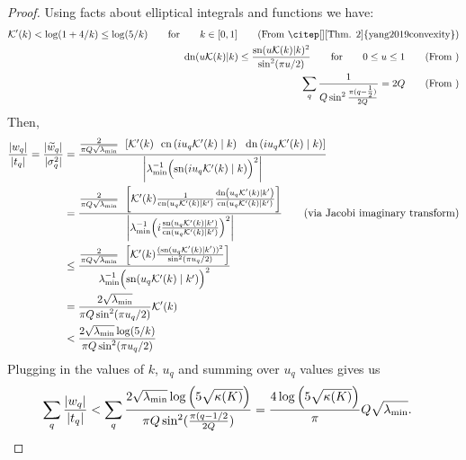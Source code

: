\begin{proof}
  Using facts about elliptical integrals and functions we have\cite{yang2019convexity,siegl2016extremal,olver2010nist}:
  \begin{align}
    \mathcal{K}'(k) < \log(1 + 4 / k) \leq \log( 5 / k) \qquad {\rm for} \qquad k \in [0, 1]
    \tag{From \citep[][Thm. 2]{yang2019convexity}}
    \\
    \text{dn}(u \mathcal{K}(k) | k ) \le \frac{\text{sn}(u \mathcal{K}(k) | k )^2}{\sin^2(\pi u/2)} \qquad {\rm for} \qquad 0 \le u \le 1
    \tag{From \gp{? maybe \citep{siegl2016extremal}}}
    \\
    \sum_q \frac{1}{ Q \sin^2 \frac{\pi(q-\tfrac{1}{2})}{2Q} }  = 2 Q
    \tag{From \gp{?}}
  \end{align}
  Then,
  \begin{align*}
    \frac{|w_q|}{|t_q|}
    =
    \frac{|\widetilde w_q|}{|\sigma^2_q|}
    &= \frac{
      \frac{ 2 }{ \pi Q \sqrt{\lambda_\text{min}} }
      \:\: \left[
      \mathcal{K}'( k )
      \:\:\: \text{cn} \left( i u_q \mathcal{K}'(k) \mid k \right)
      \:\:\: \text{dn} \left( i u_q \mathcal{K}'(k) \mid k \right)
      \right]
    }{
      \left| \lambda_\text{min}^{-1} \Bigl( \text{sn}(i u_q \mathcal{K}'(k) \mid k) \Bigr)^2 \right|
    }
    \\
    &= \frac{
      \frac{ 2 }{ \pi Q \sqrt{\lambda_\text{min}} }
      \:\: \left[
      \mathcal{K}'( k )
      \frac{
        1
      }{
        \text{cn} \left( u_q \mathcal{K}'(k) \mid k' \right)
      }
      \frac{
        \text{dn} \left( u_q \mathcal{K}'(k) \mid k' \right)
      }{
        \text{cn} \left( u_q \mathcal{K}'(k) \mid k' \right)
      }
      \right]
    }{
      \left| \lambda_\text{min}^{-1} \Bigl( i \frac{
        \text{sn}(u_q \mathcal{K}'(k) \mid k')
      }{
        \text{cn}(u_q \mathcal{K}'(k) \mid k')
      }\Bigr)^2 \right|
    }
    \tag{via Jacobi imaginary transform}
    \\
    &\leq \frac{
      \frac{ 2 }{ \pi Q \sqrt{\lambda_\text{min}} }
      \:\: \left[
        \mathcal{K}'( k ) \frac{
          ({
            \text{sn}(u_q \mathcal{K}'(k) \mid k')
          })^2
        }{
          \sin^2 ( \pi u_q / 2)
        }
      \right]
    }{
      \lambda_\text{min}^{-1} \Bigl({
        \text{sn}(u_q \mathcal{K}'(k) \mid k')
      }\Bigr)^2
    }
    \\
    &= \frac{ 2 \sqrt{\lambda_\text{min}} }{ \pi Q \sin^2 ( \pi u_q / 2) } \mathcal{K}'(k)
    \\
    &< \frac{ 2 \sqrt{\lambda_\text{min}} \log(5 / k) }{ \pi Q \sin^2 ( \pi u_q / 2) }
  \end{align*}
  Plugging in the values of $k$, $u_q$ and summing over $u_q$ values gives us
  \begin{align}
    \sum_{q} \frac{|w_q|}{|t_q|}
    &<
    \sum_{q} \frac{ 2 \sqrt{\lambda_\text{min}} \log \left( 5 \sqrt{\kappa(K)} \right)}
    { \pi Q \sin^2 ( \frac{\pi (q - 1/2}{2Q}) }
    = \frac{4 \log \left( 5 \sqrt{\kappa(K)} \right)}{\pi} Q \sqrt{\lambda_\text{min}}.
  \end{align}
\end{proof}
